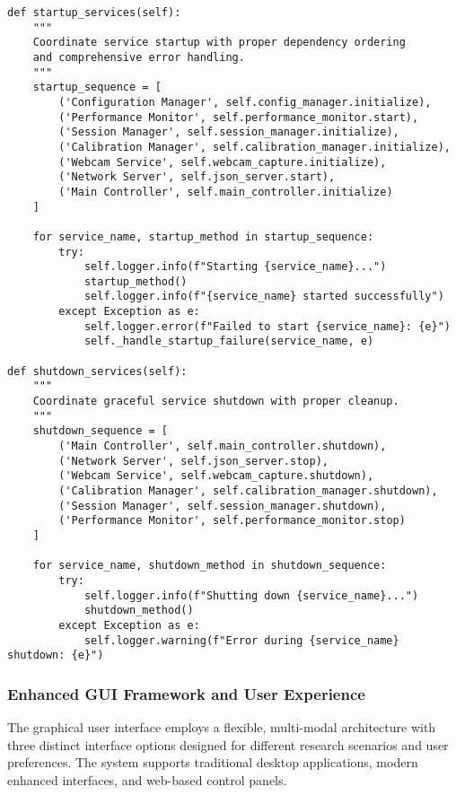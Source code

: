 \documentclass[11pt,a4paper]{article}
\begin{document}
\begin{verbatim}
def startup_services(self):
    """
    Coordinate service startup with proper dependency ordering
    and comprehensive error handling.
    """
    startup_sequence = [
        ('Configuration Manager', self.config_manager.initialize),
        ('Performance Monitor', self.performance_monitor.start),
        ('Session Manager', self.session_manager.initialize),
        ('Calibration Manager', self.calibration_manager.initialize),
        ('Webcam Service', self.webcam_capture.initialize),
        ('Network Server', self.json_server.start),
        ('Main Controller', self.main_controller.initialize)
    ]

    for service_name, startup_method in startup_sequence:
        try:
            self.logger.info(f"Starting {service_name}...")
            startup_method()
            self.logger.info(f"{service_name} started successfully")
        except Exception as e:
            self.logger.error(f"Failed to start {service_name}: {e}")
            self._handle_startup_failure(service_name, e)

def shutdown_services(self):
    """
    Coordinate graceful service shutdown with proper cleanup.
    """
    shutdown_sequence = [
        ('Main Controller', self.main_controller.shutdown),
        ('Network Server', self.json_server.stop),
        ('Webcam Service', self.webcam_capture.shutdown),
        ('Calibration Manager', self.calibration_manager.shutdown),
        ('Session Manager', self.session_manager.shutdown),
        ('Performance Monitor', self.performance_monitor.stop)
    ]

    for service_name, shutdown_method in shutdown_sequence:
        try:
            self.logger.info(f"Shutting down {service_name}...")
            shutdown_method()
        except Exception as e:
            self.logger.warning(f"Error during {service_name} shutdown: {e}")
\end{verbatim}

\subsubsection{Enhanced GUI Framework and User Experience}

The graphical user interface employs a flexible, multi-modal architecture with three distinct interface options designed
for different research scenarios and user preferences. The system supports traditional desktop applications, modern
enhanced interfaces, and web-based control panels.
\end{document}
